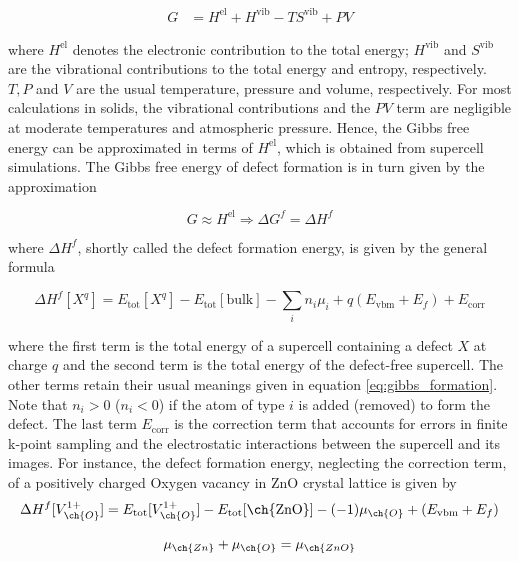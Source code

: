 \begin{align}
    G &= H^{\text{el}} + H^{\text{vib}} - TS^{\text{vib}} + PV   
\end{align}

where $H^{\text{el}}$ denotes the electronic contribution to the total energy; $H^{\text{vib}}$ and $S^{\text{vib}}$  are the vibrational contributions to the total energy and entropy, respectively. $T,P$ and $V$ are the usual temperature, pressure and volume, respectively. For most calculations in solids, the vibrational contributions and the $PV$ term are negligible at moderate temperatures and atmospheric pressure. Hence, the Gibbs free energy can be approximated in terms of   $H^{\text{el}}$, which is obtained from supercell simulations.  The Gibbs free energy of defect formation is in turn given by the approximation

\begin{equation}
    G \approx H^{\text{el}} \Longrightarrow \Delta G^f = \Delta H^f
\end{equation}

where $\Delta H^f$, shortly called the defect formation energy, is given by the general formula 

\begin{equation} \label{eq:formation_E}
    \Delta H^f [X^q] = E_{\text{tot}}[X^q] - E_{\text{tot}}[\text{bulk}] -  \sum_i n_i \mu_i + q (E_{\text{vbm}} + E_f) + E_{\text{corr}}
\end{equation}

where the first  term is  the total energy  of a supercell containing a defect $X$ at charge $q$ and the  second term is the total energy of the defect-free supercell. The other terms retain their usual meanings given in equation \eqref{eq:gibbs_formation}. Note that $n_i > 0$ ($n_i < 0$) if the atom of type $i$ is added (removed) to form the defect. The last term $E_{\text{corr}}$ is the correction term that accounts for errors in finite k-point sampling and the electrostatic interactions between the supercell and its images. For instance, the defect formation energy, neglecting the correction term, of a positively charged Oxygen vacancy in ZnO crystal lattice is given by 
\begin{equation}
    \Delta H^f [V^{1+}_{\ch{O}}] = E_{\text{tot}}[V^{1+}_{\ch{O}}] - E_{\text{tot}}[\text{\ch{ZnO}}] - (-1) \mu_{\ch{O}} + (E_{\text{vbm}} + E_f)
\end{equation}



\begin{equation}
    \mu_{\ch{Zn}} +    \mu_{\ch{O}} =     \mu_{\ch{ZnO}}
\end{equation}

